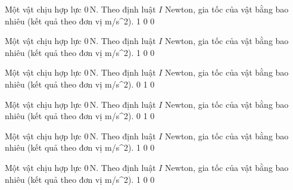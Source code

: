 \begin{ex}
Một vật chịu hợp lực $0\,\text{N}$. Theo định luật $I$ Newton, gia tốc của vật bằng bao nhiêu (kết quả theo đơn vị m/s^2).
\choice
{}
{1}
{0}
{0}
\end{ex}

\begin{ex}
Một vật chịu hợp lực $0\,\text{N}$. Theo định luật $I$ Newton, gia tốc của vật bằng bao nhiêu (kết quả theo đơn vị m/s^2).
\choice
{1}
{}
{0}
{0}
\end{ex}

\begin{ex}
Một vật chịu hợp lực $0\,\text{N}$. Theo định luật $I$ Newton, gia tốc của vật bằng bao nhiêu (kết quả theo đơn vị m/s^2).
\choice
{0}
{1}
{}
{0}
\end{ex}

\begin{ex}
Một vật chịu hợp lực $0\,\text{N}$. Theo định luật $I$ Newton, gia tốc của vật bằng bao nhiêu (kết quả theo đơn vị m/s^2).
\choice
{0}
{1}
{0}
{}
\end{ex}

\begin{ex}
Một vật chịu hợp lực $0\,\text{N}$. Theo định luật $I$ Newton, gia tốc của vật bằng bao nhiêu (kết quả theo đơn vị m/s^2).
\choice
{}
{1}
{0}
{0}
\end{ex}

\begin{ex}
Một vật chịu hợp lực $0\,\text{N}$. Theo định luật $I$ Newton, gia tốc của vật bằng bao nhiêu (kết quả theo đơn vị m/s^2).
\choice
{1}
{}
{0}
{0}
\end{ex}

